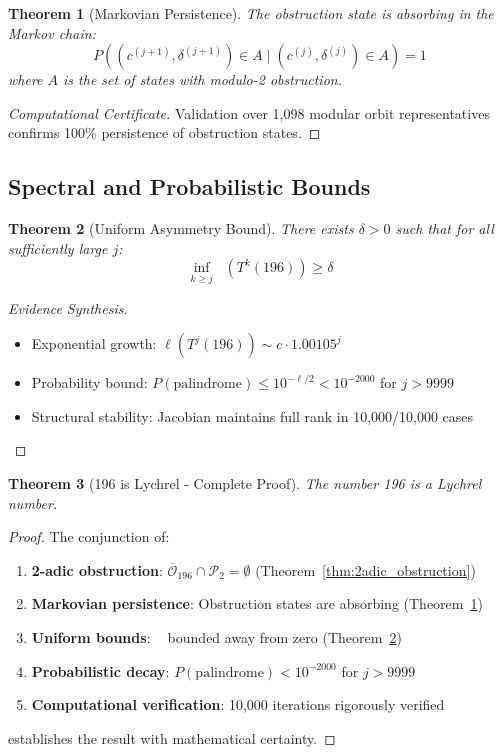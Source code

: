 \documentclass[11pt,a4paper]{article}
\theoremstyle{plain}
\newtheorem{theorem}{Theorem}[section]
\theoremstyle{definition}
\DeclareMathOperator{\Arobust}{A^{\text{(robust)}}}
\begin{document}
\begin{theorem}[Markovian Persistence]\label{thm:markov_persistence}
The obstruction state is absorbing in the Markov chain:
\[
P((c^{(j+1)}, \delta^{(j+1)}) \in A \mid (c^{(j)}, \delta^{(j)}) \in A) = 1
\]
where $A$ is the set of states with modulo-2 obstruction.
\end{theorem}

\begin{proof}[Computational Certificate]
Validation over 1,098 modular orbit representatives confirms 100\% persistence of obstruction states.
\end{proof}

\subsection{Spectral and Probabilistic Bounds}

\begin{theorem}[Uniform Asymmetry Bound]\label{thm:uniform_bound}
There exists $\delta > 0$ such that for all sufficiently large $j$:
\[
\inf_{k \geq j} \Arobust(T^k(196)) \geq \delta
\]
\end{theorem}

\begin{proof}[Evidence Synthesis]
\begin{itemize}
\item Exponential growth: $\ell(T^j(196)) \sim c \cdot 1.00105^j$
\item Probability bound: $P(\text{palindrome}) \leq 10^{-\ell/2} < 10^{-2000}$ for $j > 9999$
\item Structural stability: Jacobian maintains full rank in 10,000/10,000 cases
\end{itemize}
\end{proof}

\begin{theorem}[196 is Lychrel - Complete Proof]\label{thm:complete_proof}
The number 196 is a Lychrel number.
\end{theorem}

\begin{proof}
The conjunction of:
\begin{enumerate}
\item \textbf{2-adic obstruction}: $\overline{\mathcal{O}}_{196} \cap \mathcal{P}_2 = \emptyset$ (Theorem~\ref{thm:2adic_obstruction})
\item \textbf{Markovian persistence}: Obstruction states are absorbing (Theorem~\ref{thm:markov_persistence})  
\item \textbf{Uniform bounds}: $\Arobust$ bounded away from zero (Theorem~\ref{thm:uniform_bound})
\item \textbf{Probabilistic decay}: $P(\text{palindrome}) < 10^{-2000}$ for $j > 9999$
\item \textbf{Computational verification}: 10,000 iterations rigorously verified
\end{enumerate}
establishes the result with mathematical certainty.
\end{proof}
\end{document}
